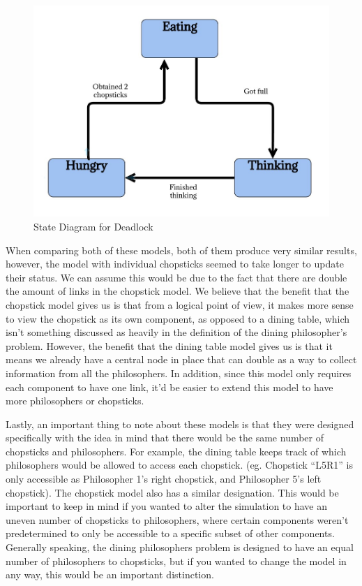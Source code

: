 \documentclass{article}
\begin{document}
\begin{figure}[H]
    \centering
    \includegraphics[scale=0.3]{images/deadlock-state-diagram.jpg}
    \caption{State Diagram for Deadlock}
\end{figure}

When comparing both of these models, both of them produce very similar results, however, the model with individual chopsticks seemed 
to take longer to update their status.  We can assume this would be due to the fact that there are double the amount of links in the 
chopstick model.  We believe that the benefit that the chopstick model gives us is that from a logical point of view, it makes more 
sense to view the chopstick as its own component, as opposed to a dining table, which isn't something discussed as heavily in the 
definition of the dining philosopher’s problem.  However, the benefit that the dining table model gives us is that it means we already 
have a central node in place that can double as a way to collect information from all the philosophers.  In addition, since this model 
only requires each component to have one link, it’d be easier to extend this model to have more philosophers or chopsticks. \newline

Lastly, an important thing to note about these models is that they were designed specifically with the idea in mind that there 
would be the same number of chopsticks and philosophers.  For example, the dining table keeps track of which philosophers would be 
allowed to access each chopstick. (eg. Chopstick “L5R1” is only accessible as Philosopher 1’s right chopstick, and Philosopher 5’s 
left chopstick).  The chopstick model also has a similar designation.  This would be important to keep in mind if you wanted to alter 
the simulation to have an uneven number of chopsticks to philosophers, where certain components weren’t predetermined to only be 
accessible to a specific subset of other components.  Generally speaking, the dining philosophers problem is designed to have an 
equal number of philosophers to chopsticks, but if you wanted to change the model in any way, this would be an important distinction.  
\end{document}
